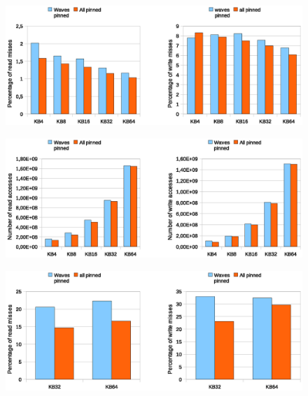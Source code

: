 \begin{figure}[htbp]
\centering
\includegraphics[width=\widefigure]{images/cpuaff/cpuaff_l1_load_store_i7.eps}
\caption{}
\label{fig:cpuaff_l1_load_i7}
\end{figure}

\begin{figure}[htbp]
\centering
\includegraphics[width=\widefigure]{images/cpuaff/cpuaff_acc_l3_load_store_i7.eps}
\caption{}
\label{fig:cpuaff_acc_l2_load_store_i7}
\end{figure}

\begin{figure}[htbp]
\centering
\includegraphics[width=\widefigure]{images/cpuaff/cpuaff_l3_load_store_i7.eps}
\caption{}
\label{fig:cpuaff_l1_load_i7}
\end{figure}

